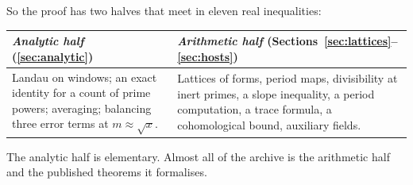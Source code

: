 So the proof has two halves that meet in eleven real inequalities:
\begin{center}
\begin{tabular}{@{}p{}@{\qquad}p{}@{}}
\toprule
\emph{Analytic half} (\cref{sec:analytic}) & \emph{Arithmetic half} (Sections~\ref{sec:lattices}--\ref{sec:hosts})\\
\midrule
Landau on windows; an exact identity for a count of prime powers; averaging; balancing three
error terms at $m\approx\sqrt x$.
&
Lattices of forms, period maps, divisibility at inert primes, a slope inequality, a period
computation, a trace formula, a cohomological bound, auxiliary fields.\\
\bottomrule
\end{tabular}
\end{center}
The analytic half is elementary. Almost all of the archive is the
arithmetic half and the published theorems it formalises.

